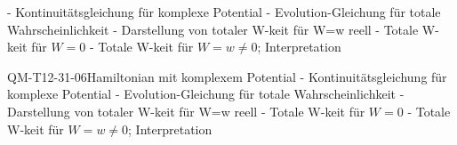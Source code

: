 - Kontinuitätsgleichung für komplexe Potential
- Evolution-Gleichung für totale Wahrscheinlichkeit
- Darstellung von totaler W-keit für W=w reell
- Totale W-keit für $W=0$
- Totale W-keit für $W=w\neq 0$; Interpretation

\begin{REM}{QM-T12-31-06}{Hamiltonian mit komplexem Potential
- Kontinuitätsgleichung für komplexe Potential
- Evolution-Gleichung für totale Wahrscheinlichkeit
- Darstellung von totaler W-keit für W=w reell
- Totale W-keit für $W=0$
- Totale W-keit für $W=w\neq 0$; Interpretation}
\end{REM}
